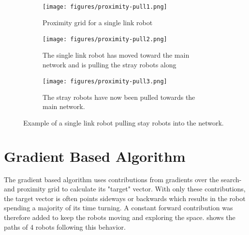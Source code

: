 \begin{figure}[h]
    \begin{center}
        \begin{subfigure}[b]{0.31\textwidth}
            \centering
            \texttt{[image: figures/proximity-pull1.png]}
            \caption{Proximity grid for a {\color{red} single link} robot}
            \label{fig:proximity-pull1}
        \end{subfigure}
        \begin{subfigure}[b]{0.31\textwidth}
            \centering
            \texttt{[image: figures/proximity-pull2.png]}
            \caption{The single link robot has moved toward the main network and is pulling the stray robots along}
            \label{fig:proximity-pull2}
        \end{subfigure}
        \begin{subfigure}[b]{0.31\textwidth}
            \centering
            \texttt{[image: figures/proximity-pull3.png]}
            \caption{The stray robots have now been pulled towards the main network.}
            \label{fig:proximity-pull3}
        \end{subfigure}
    \end{center}
    \caption{Example of a {\color{red} single link} robot pulling stay robots into the network.}\label{fig:proximity-pull}
\end{figure}


\section{Gradient Based Algorithm}
The gradient based algorithm uses contributions from gradients over the search{\color{red}-} and proximity grid to calculate its "target" vector. With only these contributions, the target vector is often points sideways or backwards which results in the robot spending a majority of its time turning. A constant forward contribution was therefore added to keep the robots moving and exploring the space.  shows the paths of 4 robots following this behavior.


